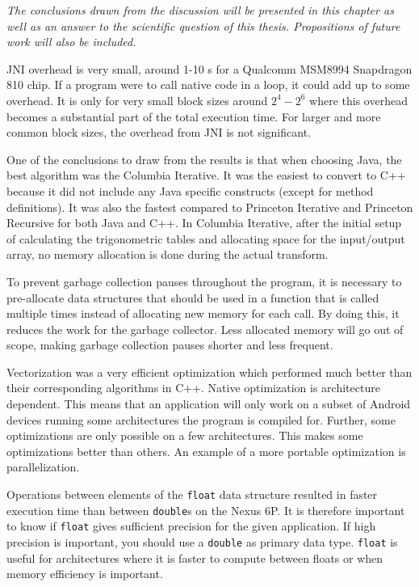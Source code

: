 \textit{The conclusions drawn from the discussion will be presented in this chapter as well as an answer to the scientific question of this thesis. Propositions of future work will also be included.}

JNI overhead is very small, around 1-10 \textmu s for a Qualcomm MSM8994 Snapdragon 810 chip. If a program were to call native code in a loop, it could add up to some overhead. It is only for very small block sizes around $2^4 - 2^6$ where this overhead becomes a substantial part of the total execution time. For larger and more common block sizes, the overhead from JNI is not significant.

One of the conclusions to draw from the results is that when choosing Java, the best algorithm was the Columbia Iterative. It was the easiest to convert to C++ because it did not include any Java specific constructs (except for method definitions). It was also the fastest compared to Princeton Iterative and Princeton Recursive for both Java and C++. In Columbia Iterative, after the initial setup of calculating the trigonometric tables and allocating space for the input/output array, no memory allocation is done during the actual transform.

To prevent garbage collection pauses throughout the program, it is necessary to pre-allocate data structures that should be used in a function that is called multiple times instead of allocating new memory for each call. By doing this, it reduces the work for the garbage collector. Less allocated memory will go out of scope, making garbage collection pauses shorter and less frequent.

Vectorization was a very efficient optimization which performed much better than their corresponding algorithms in C++. Native optimization is architecture dependent. This means that an application will only work on a subset of Android devices running some architectures the program is compiled for. Further, some optimizations are only possible on a few architectures. This makes some optimizations better than others. An example of a more portable optimization is parallelization.

Operations between elements of the \texttt{float} data structure resulted in faster execution time than between \texttt{double}s on the Nexus 6P. It is therefore important to know if \texttt{float} gives sufficient precision for the given application. If high precision is important, you should use a \texttt{double} as primary data type. \texttt{float} is useful for architectures where it is faster to compute between floats or when memory efficiency is important.

